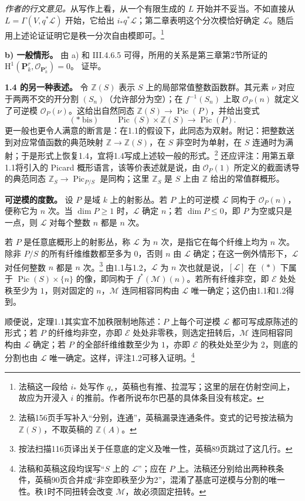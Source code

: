 \documentclass[openany,fontset=fandol]{ctexbook}
\newcommand{\OO}{\mathcal O}
\newcommand{\LL}{\mathcal L}
\newcommand{\MM}{\mathcal M}
\newcommand{\EE}{\mathcal E}
\DeclareMathOperator{\Pic}{Pic}
\begin{document}
\emph{作者的行文意见。}从写作上看，从一个有限生成的 \(L\) 开始并不妥当。不如直接从 \(L=\Gamma(V,q^*\LL)\) 开始，它给出 \(i_*q^*\LL\)；第二章表明这个分次模恰好确定 \(\LL\)。随后用上述论证证明它是秩一分次自由模即可。\footnote{法稿这一段给 \(i_*\) 处写作 \(q_*\)，英稿也有推、拉混写；这里的层在仿射空间上，故应为开浸入 \(i\) 的推前。作者所说布尔巴基的具体条目没有核定。}

\medskip\noindent\textbf{b) 一般情形。}
由 a) 和 III.4.6.5 可得，所用的关系是第三章第2节所证的
\(\mathrm H^1(\mathbf P_k^r,\OO_{\mathbf P_k^r})=0\)。
\hfill 证毕。

\medskip\noindent\textbf{1.4 的另一种表述。}
令 \(\mathbb Z(S)\) 表示 \(S\) 上的局部常值整数函数群。其元素 \(\nu\) 对应于两两不交的开分割 \((S_n)\)（允许部分为空）；在 \(f^{-1}(S_n)\) 上取 \(\OO_P(n)\) 就定义了可逆模 \(\OO_P(\nu)\)。这给出自然同态 \(\mathbb Z(S)\to\Pic(P)\)，并给出变式
\[
(*\mathrm{\ bis})\qquad \Pic(S)\times\mathbb Z(S)\longrightarrow\Pic(P).
\]
更一般也更令人满意的断言是：在1.1的假设下，此同态为双射。附记：把整数送到对应常值函数的典范映射 \(\mathbb Z\to\mathbb Z(S)\)，在 \(S\) 非空时为单射，在 \(S\) 连通时为满射；于是形式上恢复1.4，宜将1.4写成上述较一般的形式。\footnote{法稿156页手写补入“分别，连通”，英稿漏录连通条件。变式的记号按法稿为 \(\mathbb Z(S)\)，不取英稿的 \(\mathbb Z(A)\)。}
还应评注：用第五章1.1将引入的 Picard 概形语言，该等价表述就是说，由 \(\OO_P(1)\) 所定义的截面诱导的典范同态
\(\mathbb Z_S\to\Pic_{P/S}\)
是同构；这里 \(\mathbb Z_S\) 是 \(S\) 上由 \(\mathbb Z\) 给出的常值群概形。

\medskip\noindent\textbf{可逆模的度数。}
设 \(P\) 是域 \(k\) 上的射影丛。若 \(P\) 上的可逆模 \(\LL\) 同构于 \(\OO_P(n)\)，便称它为 \(n\) 次。当 \(\dim P\ge 1\) 时，\(\LL\) 确定 \(n\)；若 \(\dim P\le 0\)，即 \(P\) 为空或只是一点，则 \(\LL\) 对每个整数 \(n\) 都是 \(n\) 次。

若 \(P\) 是任意底概形上的射影丛，称 \(\LL\) 为 \(n\) 次，是指它在每个纤维上均为 \(n\) 次。除非 \(P/S\) 的所有纤维维数都至多为 \(0\)，否则 \(n\) 由 \(\LL\) 确定；在这一例外情形下，\(\LL\) 对任何整数 \(n\) 都是 \(n\) 次。\footnote{按法扫描116页译出关于任意底的定义及唯一性，英稿89页跳过了这几行。}
由1.1与1.2，\(\LL\) 为 \(n\) 次也就是说，\([\LL]\) 在 \((*)\) 下属于 \(\Pic(S)\times\{n\}\) 的像，即同构于 \(f^*(\MM)(n)\)。若所有纤维非空，即 \(\EE\) 处处秩至少为 \(1\)，则对固定的 \(n\)，\(\MM\) 连同相容同构由 \(\LL\) 唯一确定；这仍由1.1和1.2得到。

顺便说，定理1.1其实宜不加秩限制地陈述：\(P\) 上每个可逆模 \(\LL\) 都可写成原陈述的形式；若 \(P\) 的纤维均非空，亦即 \(\EE\) 处处非零秩，则选定扭转后，\(\MM\) 连同相容同构由 \(\LL\) 确定；若 \(P\) 的全部纤维维数至少为 \(1\)，亦即 \(\EE\) 的秩处处至少为 \(2\)，则底的分割也由 \(\LL\) 唯一确定。这样，评注1.2可移入证明。\footnote{法稿和英稿这段均误写“\(S\) 上的 \(\LL\)”；应在 \(P\) 上。法稿还分别给出两种秩条件，英稿90页合并成“非空即秩至少为2”，混淆了基底可逆模与分割的唯一性。秩1时不同扭转会改变 \(\MM\)，故必须固定扭转。}
\end{document}
